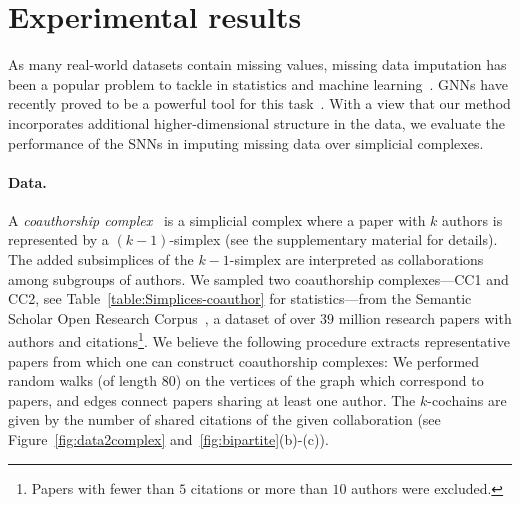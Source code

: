 \section{Experimental results}

As many real-world datasets contain missing values, missing data imputation has been a popular problem to tackle in statistics and machine learning~\cite{little1986statistical, nelwamondo2007missing}.
GNNs have recently proved to be a powerful tool for this task~\cite{spinelli2020neural}.
With a view that our method incorporates additional higher-dimensional structure in the data, we evaluate the performance of the SNNs in imputing missing data over simplicial complexes.

\paragraph{Data.}
A \emph{coauthorship complex}~\cite{patania2017} is a simplicial complex where a paper with $k$ authors is represented by a $(k-1)$-simplex (see the supplementary material for details). The added subsimplices of the $k-1$-simplex are interpreted as collaborations among subgroups of authors.
We sampled two coauthorship complexes---CC1 and CC2, see Table~\ref{table:Simplices-coauthor} for statistics---from the Semantic Scholar Open Research Corpus~\cite{ammar18NAACL}, a dataset of over $39$ million research papers with authors and citations\footnote{Papers with fewer than $5$ citations or more than $10$ authors were excluded.}.
We believe the following procedure extracts representative papers from which one can construct coauthorship complexes: We performed random walks (of length $80$) on the vertices of the graph which correspond to papers, and edges connect papers sharing at least one author. The $k$-cochains are given by the number of shared citations of the given collaboration (see Figure~\ref{fig:data2complex} and~\ref{fig:bipartite}(b)-(c)).
